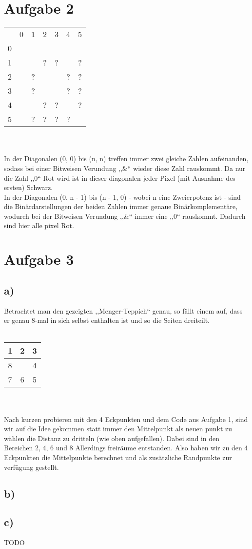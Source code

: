 \documentclass[10pt,a4paper]{article}
\begin{document}
\section{Aufgabe 2}
 \begin{tabular}{ccccccc}
    & 0 & 1 & 2 & 3 & 4 & 5\\
  0 & \cellcolor{red} & \cellcolor{red} & \cellcolor{red} & \cellcolor{red} & \cellcolor{red} & \cellcolor{red}\\
  1 & \cellcolor{red} & \cellcolor{black} & ? & ? & \cellcolor{red} & ?\\
  2 & \cellcolor{red} & ? & \cellcolor{black} & \cellcolor{red} & ? & ?\\
  3 & \cellcolor{red} & ? & \cellcolor{red} & \cellcolor{black} & ? & ?\\
  4 & \cellcolor{red} & \cellcolor{red} & ? & ? & \cellcolor{black} & ?\\
  5 & \cellcolor{red} & ? & ? & ? & ? & \cellcolor{black}\\
 \end{tabular}
 \\
 \\
In der Diagonalen (0, 0) bis (n, n) treffen immer zwei gleiche Zahlen aufeinanden, sodass bei einer Bitweisen Verundung ,,\&`` wieder diese Zahl rauskommt. Da nur die Zahl ,,0`` Rot wird ist in dieser diagonalen jeder Pixel (mit Ausnahme des ersten) Schwarz.
\\
In der Diagonalen (0, n - 1) bis (n - 1, 0) - wobei n eine Zweierpotenz ist - sind die Binärdarstellungen der beiden Zahlen immer genaue Binärkomplementäre, wodurch bei der Bitweisen Verundung ,,\&`` immer eine ,,0`` rauskommt. Dadurch sind hier alle pixel Rot.

\section{Aufgabe 3}
\subsection*{a)}
Betrachtet man den gezeigten ,,Menger-Teppich`` genau, so fällt einem auf, dass er genau 8-mal in sich selbst enthalten ist und so die Seiten dreiteilt.
\\
 \\
 \begin{tabular}{|c|c|c|} \hline
	  1 & 2 & 3 \\ \hline
	  8 &   & 4 \\ \hline
	  7 & 6 & 5 \\ \hline
 \end{tabular}
 \\
 \\
 Nach kurzen probieren mit den 4 Eckpunkten und dem Code aus Aufgabe 1, sind wir auf die Idee gekommen statt immer den Mittelpunkt als neuen punkt zu wählen die Distanz zu dritteln (wie oben aufgefallen). Dabei sind in den Bereichen 2, 4, 6 und 8 Allerdings freiräume entstanden. Also haben wir zu den 4 Eckpunkten die Mittelpunkte berechnet und als zusätzliche Randpunkte zur verfügung gestellt.

\subsection*{b)}
\subsection*{c)}
TODO
\end{document}

